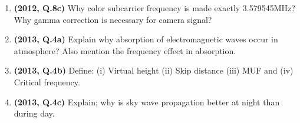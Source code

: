 \documentclass[12pt, a4paper]{article}
\begin{document}
\begin{enumerate}
		\item \textbf{(2012, Q.8c)} Why color subcarrier frequency is made exactly 3.579545MHz? Why gamma correction is necessary for camera signal?
		
		\item \textbf{(2013, Q.4a)} Explain why absorption of electromagnetic waves occur in atmosphere? Also mention the frequency effect in absorption.
		\item \textbf{(2013, Q.4b)} Define: (i) Virtual height (ii) Skip distance (iii) MUF and (iv) Critical frequency.
		\item \textbf{(2013, Q.4c)} Explain; why is sky wave propagation better at night than during day.
		
	\end{enumerate}
	
\end{document}
